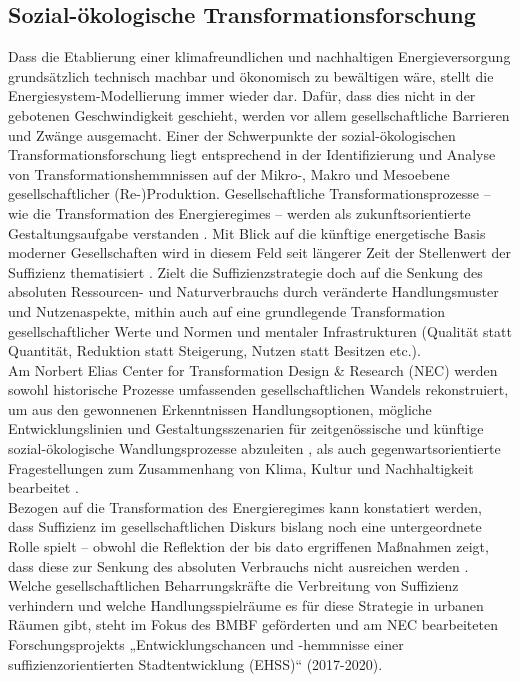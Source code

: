 \documentclass[a4paper,11pt,twoside]{scrartcl}
\begin{document}
\subsection*{Sozial-ökologische Transformationsforschung}
Dass die Etablierung einer klimafreundlichen und nachhaltigen Energieversorgung grundsätzlich technisch machbar und ökonomisch zu bewältigen wäre, stellt die Energiesystem-Modellierung immer wieder dar. Dafür, dass dies nicht in der gebotenen Geschwindigkeit geschieht, werden vor allem gesellschaftliche Barrieren und Zwänge ausgemacht.
Einer der Schwerpunkte der sozial-ökologischen Transformationsforschung liegt entsprechend in der Identifizierung und Analyse von Transformationshemmnissen auf der Mikro-, Makro und Mesoebene gesellschaftlicher (Re-)Produktion. Gesellschaftliche Transformationsprozesse -- wie die Transformation des Energieregimes -- werden als zukunftsorientierte Gestaltungsaufgabe verstanden \cite{Sommer2016}. Mit Blick auf die künftige energetische Basis moderner Gesellschaften wird in diesem Feld seit längerer Zeit der Stellenwert der Suffizienz thematisiert \cite{Huber1995,Fischer2013,Schneidewind2013}. Zielt die Suffizienzstrategie doch auf die Senkung des absoluten Ressourcen- und Naturverbrauchs durch veränderte Handlungsmuster und Nutzenaspekte, mithin auch auf eine grundlegende Transformation gesellschaftlicher Werte und Normen \cite{Muller2009} und mentaler Infrastrukturen (Qualität statt Quantität, Reduktion statt Steigerung, Nutzen statt Besitzen etc.).\\
Am Norbert Elias Center for Transformation Design & Research (NEC) werden sowohl historische Prozesse umfassenden gesellschaftlichen Wandels rekonstruiert, um aus den gewonnenen Erkenntnissen Handlungsoptionen, mögliche Entwicklungslinien und Gestaltungsszenarien für zeitgenössische und künftige sozial-ökologische Wandlungsprozesse abzuleiten \cite{Christ2015,Christ2016}, als auch gegenwartsorientierte Fragestellungen zum Zusammenhang von Klima, Kultur und Nachhaltigkeit bearbeitet \cite{Sommer2011,Sommer2015,Stumpf2015}.\\
Bezogen auf die Transformation des Energieregimes kann konstatiert werden, dass Suffizienz im gesellschaftlichen Diskurs bislang noch eine untergeordnete Rolle spielt – obwohl die Reflektion der bis dato ergriffenen Maßnahmen zeigt, dass diese zur Senkung des absoluten Verbrauchs nicht ausreichen werden \cite{Brischke2016}. Welche gesellschaftlichen Beharrungskräfte die Verbreitung von Suffizienz verhindern und welche Handlungsspielräume es für diese Strategie in urbanen Räumen gibt, steht im Fokus des BMBF geförderten und am NEC bearbeiteten Forschungsprojekts „Entwicklungschancen und -hemmnisse einer suffizienzorientierten Stadtentwicklung (EHSS)“ (2017-2020).
\end{document}
